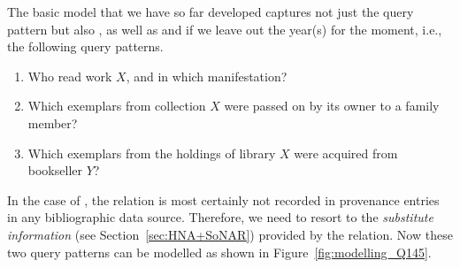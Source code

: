 The basic model that we have so far developed captures not just the query pattern 
but also , as well as  and  if we leave out the year(s) for the moment, i.e.,
the following query patterns.
%
\begin{enumerate}
  \item[\exaquery{1$^-$}]
    Who read
    work $X$, and
    in which manifestation?
  \item[\exaquery{4\phantom{$^-$}}]
    Which exemplars from collection $X$ were passed on by its owner to a family member?
  \item[\exaquery{5$^-$}]
    Which exemplars from the holdings of library $X$ were acquired from bookseller $Y$?
\end{enumerate}
%
In the case of , the relation  is most certainly not recorded in provenance entries
in any bibliographic data source. Therefore, we need to resort to the \emph{substitute information}
(see Section~\ref{sec:HNA+SoNAR}) provided by the  relation.
Now these two query patterns
can be modelled as shown in Figure~\ref{fig:modelling_Q145}.
%  
